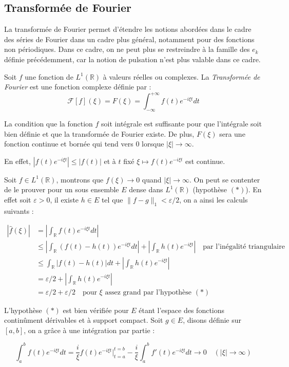 	\subsection{Transformée de Fourier}
		La transformée de Fourier permet d'étendre les notions abordées dans le cadre des séries de Fourier dans un cadre plus général, notamment pour des fonctions non périodiques. 
		Dans ce cadre, on ne peut plus se restreindre à la famille des $e_k$ définie précédemment, car la notion de pulsation n'est plus valable dans ce cadre. 
	
	\begin{mydef}
		Soit $f$ une fonction de $L^1(\mathbb{R})$ à valeurs réelles ou complexes. La \textit{Transformée de Fourier} est une fonction complexe définie par :
		$$ \mathcal{F}[f](\xi) = F(\xi)= \int_{-\infty}^{+\infty}f(t)e^{-i\xi t}dt $$ 
	\end{mydef}

	\begin{myrem}
		La condition que la fonction $f$ soit intégrale est suffisante pour que l'intégrale soit bien définie et que la transformée de Fourier existe. 
		De plus, $F(\xi)$ sera une fonction continue et bornée qui tend vers 0 lorsque $|\xi| \longrightarrow \infty$.
		
		En effet, $|f(t)e^{-i \xi t}| \leqslant |f(t)|$ et à $t$ fixé $\xi \mapsto f(t) e^{- i \xi t}$ est continue.
	\end{myrem}
	
	\begin{myproof}
		Soit $f \in L^1(\mathbb{R})$, montrons que $f(\xi) \to 0$ quand $|\xi| \to \infty$. On peut se contenter de le prouver pour un sous ensemble $E$ dense dans $L^1(\mathbb{R})$ (hypothèse $(*)$). En effet soit $\varepsilon > 0$, il existe $h \in E$ tel que $\|f - g\|_1 < \varepsilon / 2$, on a ainsi les calculs suivants :
		
		\begin{align*}
			|\hat{f}(\xi)| & = \left|\int_\mathbb{R} f(t) e^{-i \xi t} dt\right| \\
			& \leqslant \left|\int_\mathbb{R} (f(t) - h(t))e^{- i \xi t} dt\right| + \left|\int_\mathbb{R} h(t) e^{- i \xi t}\right| \quad \text{par l'inégalité triangulaire} \\
			& \leqslant \int_{\mathbb{R}} |f(t) - h(t)| dt + \left|\int_\mathbb{R} h(t) e^{- i \xi t}\right| \\
			&= \varepsilon / 2 + \left|\int_\mathbb{R} h(t) e^{- i \xi t}\right| \\
			&= \varepsilon/2 + \varepsilon/2 \quad \text{pour $\xi$ assez grand par l'hypothèse } (*)
		\end{align*}
		
		L'hypothèse $(*)$ est bien vérifiée pour $E$ étant l'espace des fonctions continûment dérivables et à support compact. Soit $g \in E$, disons définie sur $[a, b]$, on a grâce à une intégration par partie :
		
		$$\int_{a}^{b} f(t) e^{- i \xi t} dt = \frac{i}{\xi} f(t) e^{- i \xi t} \bigg\vert_{t = a}^{t=b} - \frac{i}{\xi} \int_{a}^{b} f'(t) e^{- i \xi t} dt \longrightarrow 0 \quad (|\xi| \to \infty)$$
		
		\cqfd
	\end{myproof}
	
